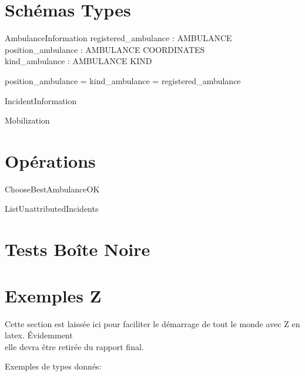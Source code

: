 \documentclass[12pt]{article}
\begin{document}
\section{Schémas Types}
\begin{schema}{AmbulanceInformation}
 registered\_ambulance : \power AMBULANCE \\
 position\_ambulance : AMBULANCE \pinj COORDINATES \\
 kind\_ambulance : AMBULANCE \pfun KIND \\
  
  \where
  
  \dom position\_ambulance = \dom kind\_ambulance = registered\_ambulance
  
\end{schema}

\begin{schema}{IncidentInformation}
  \where
\end{schema}

\begin{schema}{Mobilization}
  \where
\end{schema}

\section{Opérations}

\begin{schema}{ChooseBestAmbulanceOK}
  \where
\end{schema}

\begin{schema}{ListUnattributedIncidents}
  \where
\end{schema}

\section{Tests Boîte Noire}




\section{Exemples Z}
Cette section est laissée ici pour faciliter le démarrage de tout le monde avec Z en latex.  Évidemment\\ elle devra être retirée du rapport final.

Exemples de types donnés:
\begin{zed}
\end{zed}
\end{document}
